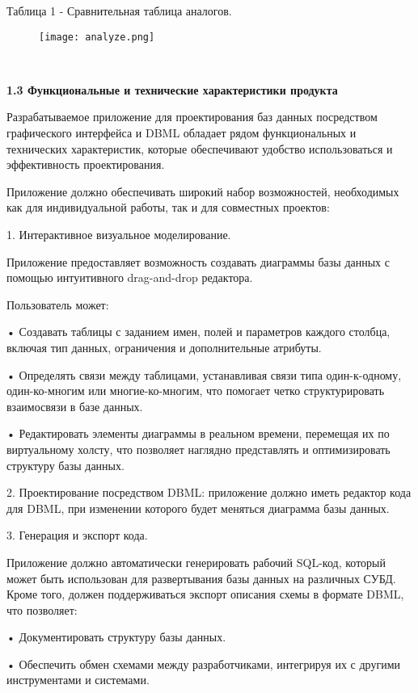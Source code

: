 \newpage
Таблица 1 - Сравнительная таблица аналогов.
\begin{figure}[htbp]
    \centering %
    \texttt{[image: analyze.png]} %
    \label{fig:analyze} %
\end{figure}

\

\textbf{\large 1.3 Функциональные и технические характеристики продукта}

Разрабатываемое приложение для проектирования баз данных посредством графического интерфейса и DBML обладает рядом функциональных и технических характеристик, которые обеспечивают удобство использоваться и эффективность проектирования.

Приложение должно обеспечивать широкий набор возможностей, необходимых как для индивидуальной работы, так и для совместных проектов:

1. Интерактивное визуальное моделирование.

Приложение предоставляет возможность создавать диаграммы базы данных с помощью интуитивного drag-and-drop редактора.

Пользователь может:

• Создавать таблицы с заданием имен, полей и параметров каждого столбца, включая тип данных, ограничения и дополнительные атрибуты.

• Определять связи между таблицами, устанавливая связи типа один-к-одному, один-ко-многим или многие-ко-многим, что помогает четко структурировать взаимосвязи в базе данных.

• Редактировать элементы диаграммы в реальном времени, перемещая их по виртуальному холсту, что позволяет наглядно представлять и оптимизировать структуру базы данных.

2. Проектирование посредством DBML: приложение должно иметь редактор кода для DBML, при изменении которого будет меняться диаграмма базы данных.

3. Генерация и экспорт кода.

Приложение должно автоматически генерировать рабочий SQL-код, который может быть использован для развертывания базы данных на различных СУБД. Кроме того, должен поддерживаться экспорт описания схемы в формате DBML, что позволяет:

• Документировать структуру базы данных.

• Обеспечить обмен схемами между разработчиками, интегрируя их с другими инструментами и системами.


